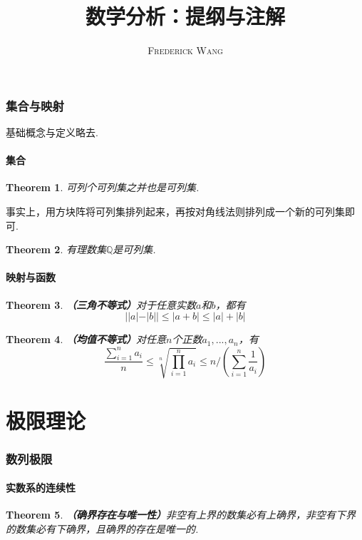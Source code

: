 \documentclass[9pt]{ctexart}
\title{\bf{数学分析：提纲与注解}}
\author{\textsc{Frederick Wang}}
\date{}
\newtheorem{theorem}{Theorem}[section]
\begin{document}
\maketitle
\section{集合与映射}
\par{基础概念与定义略去.}
\subsection{集合}
\begin{theorem}
    可列个可列集之并也是可列集.
\end{theorem}

\par{事实上，用方块阵将可列集排列起来，再按对角线法则排列成一个新的可列集即可.}

\begin{theorem}
    有理数集$\mathbb{Q}$是可列集.
\end{theorem}

\subsection{映射与函数}

\begin{theorem}
    \textbf{（三角不等式）}对于任意实数$a$和$b$，都有
    \[||a|-|b||\leq |a+b|\leq |a|+|b|\]
\end{theorem}

\begin{theorem}
    \textbf{（均值不等式）}对任意$n$个正数$a_1,...,a_n$，有
    \[\frac{\sum_{i=1}^n a_i}{n}\leq \sqrt[n]{\prod_{i=1}^n a_i}\leq n/(\sum_{i=1}^n \frac{1}{a_i})\]
\end{theorem}

\part{极限理论}
\section{数列极限}
\subsection{实数系的连续性}
\begin{theorem}
    \textbf{（确界存在与唯一性）}非空有上界的数集必有上确界，非空有下界的数集必有下确界，且确界的存在是唯一的.
\end{theorem}
\end{document}
